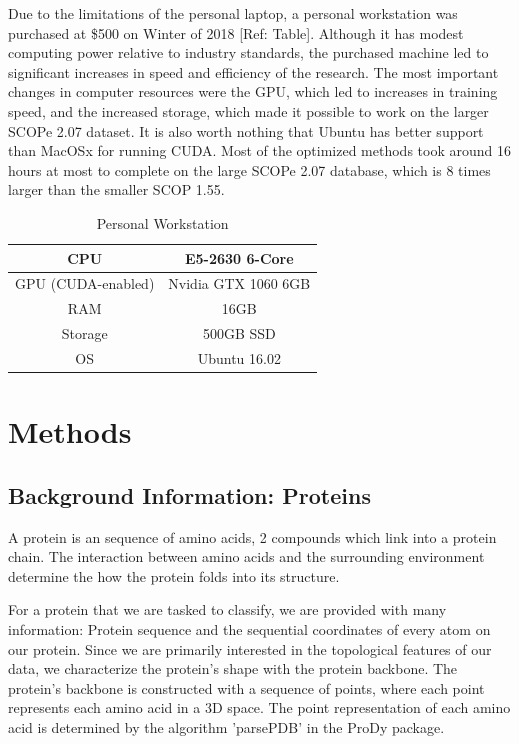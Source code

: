\documentclass[12pt, a4paper, twocolumn, fullpage]{article}
\theoremstyle{plain}
\theoremstyle{definition}
\theoremstyle{remark}
\begin{document}
Due to the limitations of the personal laptop, a personal workstation was purchased at \$500 on Winter of 2018 [Ref: Table]. Although it has modest computing power relative to industry standards, the purchased machine led to significant increases in speed and efficiency of the research. The most important changes in computer resources were the GPU, which led to increases in training speed, and the increased storage, which made it possible to work on the larger SCOPe 2.07 dataset. It is also worth nothing that Ubuntu has better support than MacOSx for running CUDA.
Most of the optimized methods took around 16 hours at most to complete on the large SCOPe 2.07 database, which is 8 times larger than the smaller SCOP 1.55. 

\begin{table}[t]
    \centering
    \begin{tabular}{c | c}
        CPU & E5-2630 6-Core \\ \hline
        GPU (CUDA-enabled) & Nvidia GTX 1060 6GB     \\ \hline
        RAM & 16GB    \\ \hline
        Storage & 500GB SSD \\ \hline
        OS & Ubuntu 16.02  
    \end{tabular}
    \caption{Personal Workstation}
    \label{tbl:Computer 2}
\end{table}

\section{Methods}

\subsection{ Background Information: Proteins} \label{Background Information: Proteins}
A protein is an sequence of amino acids, 2 compounds which link into a protein chain. The interaction between amino acids and the surrounding environment determine the how the protein folds into its structure.

For a protein that we are tasked to classify, we are provided with many information: Protein sequence and the sequential coordinates of every atom on our protein. Since we are primarily interested in the topological features of our data, we characterize the protein's shape with the protein backbone. The protein's backbone is constructed with a sequence of points, where each point represents each amino acid in a 3D space. The point representation of each amino acid is determined by the algorithm 'parsePDB' in the ProDy package. 
\end{document}
